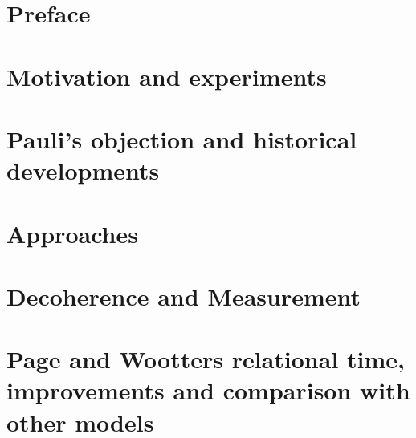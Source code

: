 




\maketitle

\tableofcontents

\listoffigures
 
\listoftables

\chapter*{Preface}


\iftodo
\chapter{Motivation and experiments}

\fi

\chapter{Pauli's objection and historical developments}


\iftodo
\chapter{Approaches}

\fi

\chapter{Decoherence and Measurement}









\chapter{Page and Wootters relational time, improvements and comparison with other models}


\iftodo

\fi

